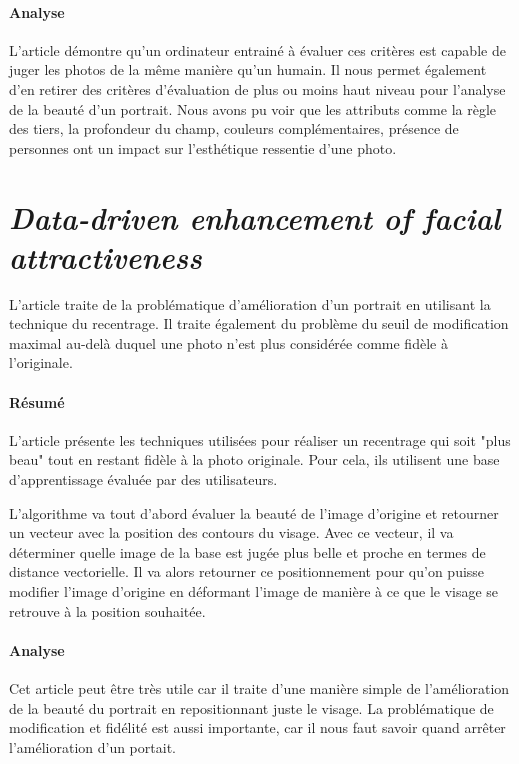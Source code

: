 \documentclass[11pt, french]{report-rd-info}
\begin{document}
\paragraph{Analyse}
L'article démontre qu'un ordinateur entrainé à évaluer ces critères est capable de juger les photos de la même manière qu'un humain.
Il nous permet également d'en retirer des critères d'évaluation de plus ou moins haut niveau pour l'analyse de la beauté d'un portrait.
Nous avons pu voir que les attributs comme la règle des tiers, la profondeur du champ, couleurs complémentaires, présence de personnes ont un impact sur l'esthétique ressentie d'une photo.

\section{\emph{Data-driven enhancement of facial attractiveness}}
L'article \cite{Leyvand2008} traite de la problématique d'amélioration d'un portrait en utilisant la technique du recentrage. Il traite également du problème du seuil de modification maximal au-delà duquel une photo n'est plus considérée comme fidèle à l'originale.

\paragraph{Résumé}
L'article présente les techniques utilisées pour réaliser un recentrage qui soit "plus beau" tout en restant fidèle à la photo originale. Pour cela, ils utilisent une base d'apprentissage évaluée par des utilisateurs.

L'algorithme va tout d'abord évaluer la beauté de l'image d'origine et retourner un vecteur avec la position des contours du visage. Avec ce vecteur, il va déterminer quelle image de la base est jugée plus belle et proche en termes de distance vectorielle. Il va alors retourner ce positionnement pour qu'on puisse modifier l'image d'origine en déformant l'image de manière à ce que le visage se retrouve à la position souhaitée.

\paragraph{Analyse}
Cet article peut être très utile car il traite d'une manière simple de l'amélioration de la beauté du portrait en repositionnant juste le visage. La problématique de modification et fidélité est aussi importante, car il nous faut savoir quand arrêter l'amélioration d'un portait.
\end{document}
